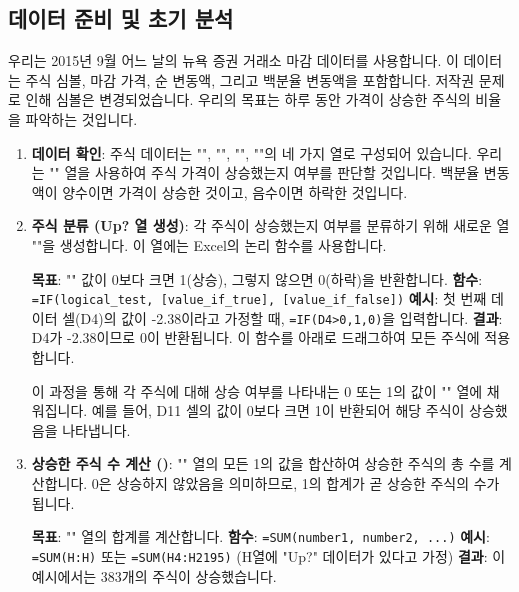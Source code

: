 \documentclass[11pt,a4paper]{article}
\theoremstyle{definition}
\newcommand{\code}[1]{\texttt{#1}}
\begin{document}
\subsection{데이터 준비 및 초기 분석}
우리는 2015년 9월 어느 날의 뉴욕 증권 거래소 마감 데이터를 사용합니다. 이 데이터는 주식 심볼, 마감 가격, 순 변동액, 그리고 백분율 변동액을 포함합니다. 저작권 문제로 인해 심볼은 변경되었습니다. 우리의 목표는 하루 동안 가격이 상승한 주식의 비율을 파악하는 것입니다.

\begin{enumerate}
    \item \textbf{데이터 확인}:
    주식 데이터는 "", "", "", ""의 네 가지 열로 구성되어 있습니다. 우리는 "" 열을 사용하여 주식 가격이 상승했는지 여부를 판단할 것입니다. 백분율 변동액이 양수이면 가격이 상승한 것이고, 음수이면 하락한 것입니다.

    \item \textbf{주식 분류 (Up? 열 생성)}:
    각 주식이 상승했는지 여부를 분류하기 위해 새로운 열 ""을 생성합니다. 이 열에는 Excel의  논리 함수를 사용합니다.
    \begin{examplebox}[title=Excel IF 함수 사용법]
        \textbf{목표}: "" 값이 0보다 크면 1(상승), 그렇지 않으면 0(하락)을 반환합니다.
        \textbf{함수}: \code{=IF(logical\_test, [value\_if\_true], [value\_if\_false])}
        \textbf{예시}: 첫 번째 데이터 셀(D4)의 값이 -2.38이라고 가정할 때, \code{=IF(D4>0,1,0)}을 입력합니다.
        \textbf{결과}: D4가 -2.38이므로 0이 반환됩니다. 이 함수를 아래로 드래그하여 모든 주식에 적용합니다.
    \end{examplebox}
    이 과정을 통해 각 주식에 대해 상승 여부를 나타내는 0 또는 1의 값이 "" 열에 채워집니다. 예를 들어, D11 셀의 값이 0보다 크면 1이 반환되어 해당 주식이 상승했음을 나타냅니다.

    \item \textbf{상승한 주식 수 계산 ()}:
    "" 열의 모든 1의 값을 합산하여 상승한 주식의 총 수를 계산합니다. 0은 상승하지 않았음을 의미하므로, 1의 합계가 곧 상승한 주식의 수가 됩니다.
    \begin{examplebox}[title=Excel SUM 함수 사용법]
        \textbf{목표}: "" 열의 합계를 계산합니다.
        \textbf{함수}: \code{=SUM(number1, number2, ...)}
        \textbf{예시}: \code{=SUM(H:H)} 또는 \code{=SUM(H4:H2195)} (H열에 "Up?" 데이터가 있다고 가정)
        \textbf{결과}: 이 예시에서는 383개의 주식이 상승했습니다.
    \end{examplebox}


\end{enumerate}
\end{document}
